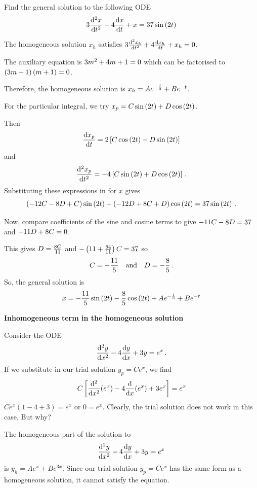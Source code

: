 
\goodbreak
\begin{example}[Lecture]
\label{ex:665}

Find the general solution to the following ODE
\[
3\frac{{\rm d} ^2x}{{\rm d} t^2}+4\frac{{\rm d} x}{{\rm d} t}+x=37\sin \left(2t\right)
\]

\end{example}
\begin{solution}

The homogeneous solution ${x}_{h}$ satisfies $3\frac{{\rm d} ^{2}{x}_{h}}{{\rm d} {t}^{2}}+4\frac{{\rm d} {x}_{h}}{{\rm d} t}+{x}_{h}=0$.

The auxiliary equation is $3{m}^{2}+4m+1=0$ which can be factorised to $\left(3m+1\right)\left(m+1\right)=0$.

Therefore, the homogeneous solution is ${x}_{h}=A{e}^{-\frac{t}{3}}+B{e}^{-t}$.

For the particular integral, we try ${x}_{p}=C\sin \left(2t\right)+D\cos \left(2t\right)$.

Then 
\[\frac{{\rm d} {x}_{p}}{{\rm d} t}=2\left[C\cos \left(2t\right)-D\sin \left(2t\right)\right]\]
and 
\[\frac{{\rm d} ^{2}{x}_{p}}{{\rm d} {t}^{2}}=-4\left[C\sin \left(2t\right)+D\cos \left(2t\right)\right] \, .
\] 
Substituting these expressions in for $x$ gives
\[
\left(-12C-8D+C\right)\sin \left(2t\right)+\left(-12D+8C+D\right)\cos \left(2t\right)=37\sin \left(2t\right) \, .
\]

Now, compare coefficients of the sine and cosine terms to give $-11C-8D=37$ and $-11D+8C=0$.

This gives $D=\frac{8C}{11}$ and $-\left(11+\frac{64}{11}\right)C=37$ so 
\[
C=-\frac{11}{5} \quad \text{and} \quad D=-\frac{8}{5} \, .
\]
So, the general solution is
\[
x=-\frac{11}{5}\sin \left(2t\right)-\frac{8}{5}\cos \left(2t\right)+A{e}^{-\frac{t}{3}}+B{e}^{-t}
\]
\end{solution}

\textbf{Inhomogeneous term in the homogeneous solution}

Consider the ODE
\[
\frac{{\rm d} ^2y}{{\rm d} x^2}-4\frac{{\rm d} y}{{\rm d} x}+3y={e}^{x} \, .
\]
If we substitute in our trial solution ${y}_{p}=C{e}^{x}$, we find
\[
C\left[\frac{{\rm d} ^{2}}{{\rm d} {x}^{2}}({e}^{x})-4\frac{{\rm d} }{{\rm d} x}({e}^{x})+3{e}^{x}\right]={e}^{x}
\]
$C{e}^{x}\left(1-4+3\right)={e}^{x}$ or $0={e}^{x}$. Clearly, the trial solution does not work in this case. But why?

The homogeneous part of the solution to
\[
\frac{{\rm d} ^{2}y}{{\rm d} {x}^{2}}-4\frac{{\rm d} y}{{\rm d} x}+3y={e}^{x}
\]
is ${y}_{h}=A{e}^{x}+B{e}^{3x}$. Since our trial solution ${y}_{p}=C{e}^{x}$ has the same form as a homogeneous solution, it cannot satisfy the equation. 

